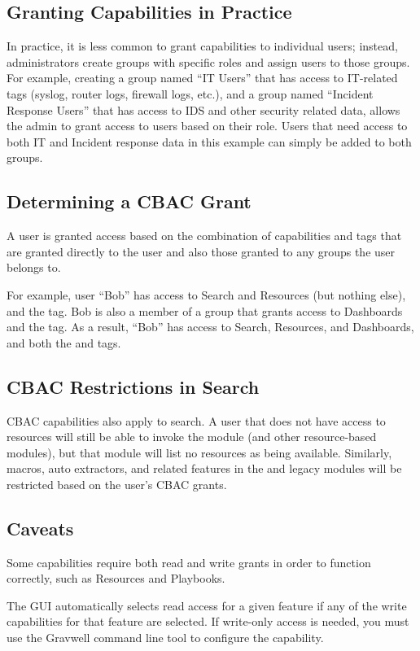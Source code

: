 \subsection{Granting Capabilities in Practice}

In practice, it is less common to grant capabilities to individual users; instead, administrators create groups with specific roles and assign users to those groups. For example, creating a group named ``IT Users'' that has access to IT-related tags (syslog, router logs, firewall logs, etc.), and a group named ``Incident Response Users'' that has access to IDS and other security related data, allows the admin to grant access to users based on their role. Users that need access to both IT and Incident response data in this example can simply be added to both groups.

\subsection{Determining a CBAC Grant}

A user is granted access based on the combination of capabilities and tags that are granted directly to the user and also those granted to any groups the user belongs to.

For example, user ``Bob'' has access to Search and Resources (but nothing else), and the  tag. Bob is also a member of a group that grants access to Dashboards and the  tag. As a result, ``Bob'' has access to Search, Resources, and Dashboards, and both the  and  tags.

\subsection{CBAC Restrictions in Search}

CBAC capabilities also apply to search. A user that does not have access to resources will still be able to invoke the  module (and other resource-based modules), but that module will list no resources as being available. Similarly, macros, auto extractors, and related features in the  and legacy  modules will be restricted based on the user's CBAC grants.

\subsection{Caveats}

Some capabilities require both read and write grants in order to function correctly, such as Resources and Playbooks.

The GUI automatically selects read access for a given feature if any of the write capabilities for that feature are selected. If write-only access is needed, you must use the Gravwell command line tool to configure the capability.

